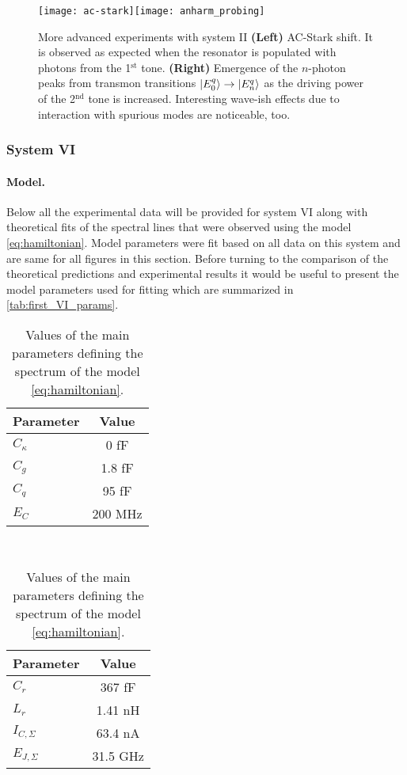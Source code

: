 \documentclass[12pt, twoside]{report}
\DeclarePairedDelimiter\ket{\lvert}{\rangle}
\numberwithin{equation}{section}
\begin{document}
\begin{figure}
\texttt{[image: ac-stark]}\texttt{[image: anharm\_probing]}
\caption{More advanced experiments with system II \textbf{(Left)} AC-Stark shift. It is observed as expected when the resonator is populated with photons from the 1$^\text{st}$ tone. \textbf{(Right)} Emergence of the $n$-photon peaks from transmon transitions $\ket{E_0^q}\rightarrow\ket{E_n^q}$ as the driving power of the 2$^\text{nd}$ tone is increased. Interesting wave-ish effects due to interaction with spurious modes are noticeable, too.}
\label{fig:first_II_ac_mp}
\end{figure}

\subsubsection{System VI}

\paragraph{Model.} Below all the experimental data will be provided for system VI along with theoretical fits of the spectral lines that were observed using the model \eqref{eq:hamiltonian}. Model parameters were fit based on all data on this system and are same for all figures in this section. Before turning to the comparison of the theoretical predictions and experimental results it would be useful to present the model parameters used for fitting which are summarized in \autoref{tab:first_VI_params}.

\begin{table}[h]
\centering
\begin{tabular}{l|c}
Parameter & Value \\
\hline 
$C_\kappa$ & 0 fF \\
\hline
$C_g$ & 1.8 fF \\
\hline
$C_q$ & 95 fF \\
\hline
$E_C$ & 200 MHz
\end{tabular}~
\begin{tabular}{l|c}
Parameter & Value\\
\hline
$C_r$ & 367 fF \\
\hline
$L_r$ & 1.41 nH \\
\hline
$I_{C, \Sigma}$ & 63.4 nA \\
\hline
$E_{J, \Sigma}$ & 31.5 GHz
\end{tabular}
\caption{Values of the main parameters defining the spectrum of the model \eqref{eq:hamiltonian}.}
\label{tab:first_VI_params}
\end{table}
\end{document}
